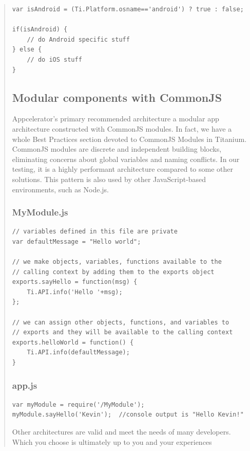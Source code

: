 \documentclass[11pt]{book}
\begin{document}
\begin{quotation}
\begin{lstlisting}[frame=single]
var isAndroid = (Ti.Platform.osname=='android') ? true : false;

if(isAndroid) {
    // do Android specific stuff
} else {
    // do iOS stuff
}
\end{lstlisting}

\subsection{Modular components with CommonJS}
Appcelerator's primary recommended architecture a modular app architecture constructed with CommonJS modules. In fact, we have a whole Best Practices section devoted to CommonJS Modules in Titanium. CommonJS modules are discrete and independent building blocks, eliminating concerns about global variables and naming conflicts. In our testing, it is a highly performant architecture compared to some other solutions. This pattern is also used by other JavaScript-based environments, such as Node.js.

\subsubsection{MyModule.js}
\begin{lstlisting}[frame=single]
// variables defined in this file are private
var defaultMessage = "Hello world";

// we make objects, variables, functions available to the
// calling context by adding them to the exports object
exports.sayHello = function(msg) {
    Ti.API.info('Hello '+msg);
};

// we can assign other objects, functions, and variables to
// exports and they will be available to the calling context
exports.helloWorld = function() {
    Ti.API.info(defaultMessage);
}
\end{lstlisting}

\subsubsection{app.js}
\begin{lstlisting}[frame=single]
var myModule = require('/MyModule');
myModule.sayHello('Kevin');  //console output is "Hello Kevin!"
\end{lstlisting}

Other architectures are valid and meet the needs of many developers. Which you choose is ultimately up to you and your experiences


\end{quotation}
\end{document}
